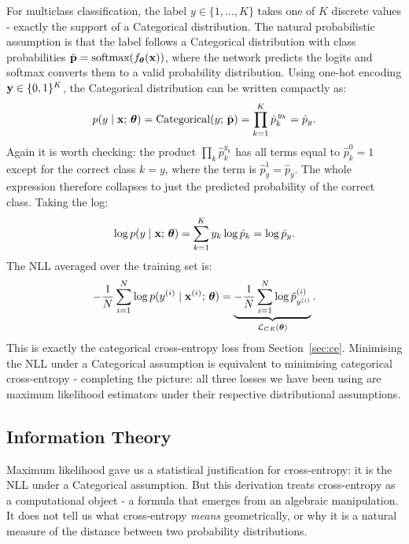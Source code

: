 For multiclass classification, the label $y \in \{1, \ldots, K\}$ takes one of $K$ discrete values - exactly the support of a Categorical distribution. The natural probabilistic assumption is that the label follows a Categorical distribution with class probabilities $\hat{\mathbf{p}} = \text{softmax}(f_{\boldsymbol{\theta}}(\mathbf{x}))$, where the network predicts the logits and softmax converts them to a valid probability distribution. Using one-hot encoding $\mathbf{y} \in \{0,1\}^K$, the Categorical distribution can be written compactly as:
\begin{equation}
    p(y \mid \mathbf{x};\, \boldsymbol{\theta}) = \text{Categorical}(y;\, \hat{\mathbf{p}}) = \prod_{k=1}^{K} \hat{p}_k^{\,y_k} = \hat{p}_y.
\end{equation}
Again it is worth checking: the product $\prod_k \hat{p}_k^{y_k}$ has all terms equal to $\hat{p}_k^0 = 1$ except for the correct class $k=y$, where the term is $\hat{p}_y^1 = \hat{p}_y$. The whole expression therefore collapses to just the predicted probability of the correct class. Taking the log:
\begin{equation}
    \log p(y \mid \mathbf{x};\, \boldsymbol{\theta}) = \sum_{k=1}^{K} y_k \log \hat{p}_k = \log \hat{p}_y.
\end{equation}
The NLL averaged over the training set is:
\begin{equation}
    -\frac{1}{N}\sum_{i=1}^{N} \log p(y^{(i)} \mid \mathbf{x}^{(i)};\, \boldsymbol{\theta}) = \underbrace{-\frac{1}{N}\sum_{i=1}^{N} \log \hat{p}^{(i)}_{y^{(i)}}}_{\mathcal{L}_{CE}(\boldsymbol{\theta})}.
\end{equation}
This is exactly the categorical cross-entropy loss from Section~\ref{sec:ce}. Minimising the NLL under a Categorical assumption is equivalent to minimising categorical cross-entropy - completing the picture: all three losses we have been using are maximum likelihood estimators under their respective distributional assumptions.


\subsection{Information Theory}

Maximum likelihood gave us a statistical justification for cross-entropy: it is the NLL under a Categorical assumption. But this derivation treats cross-entropy as a computational object - a formula that emerges from an algebraic manipulation. It does not tell us what cross-entropy \emph{means} geometrically, or why it is a natural measure of the distance between two probability distributions.


